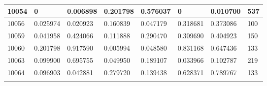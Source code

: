 \begin{table}[H]
{\begin{tabular}{|l|l|l|l|l|l|l|l|}
				10054 & {\color{red}0} & {\color{red}0.006898} & 0.201798 & 0.576037 & {\color{red}0} & {\color{red}0.010700} & 537 \\ \hline
				10056 & {\color{red}0.025974} & {\color{red}0.020923} & 0.160839 & {\color{red}0.047179} & 0.318681 & 0.373086 & 100 \\ \hline
				10059 & {\color{red}0.041958} & 0.424066 & 0.111888 & 0.290470 & 0.309690 & 0.404923 & 150 \\ \hline
				10060 & 0.201798 & 0.917590 & {\color{red}0.005994} & {\color{red}0.048580} & 0.831168 & 0.647436 & 133 \\ \hline
				10063 & 0.099900 & 0.695755 & {\color{red}0.049950} & 0.189107 & {\color{red}0.033966} & 0.102787 & 219 \\ \hline
				10064 & 0.096903 & {\color{red}0.042881} & 0.279720 & 0.139438 & 0.628371 & 0.789767 & 133 \\ \hline

\label{tab:nosocsI}
\end{tabular}
}
\end{table}

